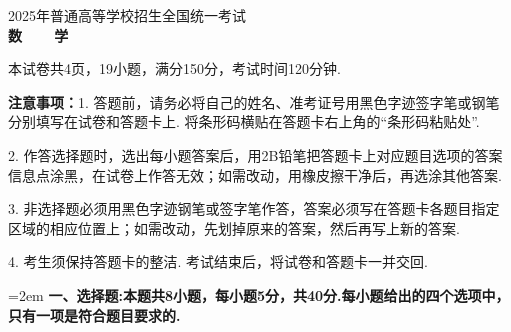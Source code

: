 \documentclass[12pt,a4paper]{article}
\begin{document}
	
	
	\vspace*{0.5cm}
	
	\begin{center}
		{\Large 2025年普通高等学校招生全国统一考试}\\[0.8cm]
		{\LARGE\bfseries 数~~~~学}
	\end{center}
	
	\noindent 本试卷共4页，19小题，满分150分，考试时间120分钟.
	
	\noindent\hangindent=73pt {\bfseries 注意事项：}1. 答题前，请务必将自己的姓名、准考证号用黑色字迹签字笔或钢笔分别填写在试卷和答题卡上.  将条形码横贴在答题卡右上角的“条形码粘贴处”. 
	
	\noindent\hangindent=73pt\hspace{61pt}2. 作答选择题时，选出每小题答案后，用2B铅笔把答题卡上对应题目选项的答案信息点涂黑，在试卷上作答无效；如需改动，用橡皮擦干净后，再选涂其他答案. 
	
	\noindent\hangindent=73pt\hspace{61pt}3. 非选择题必须用黑色字迹钢笔或签字笔作答，答案必须写在答题卡各题目指定区域的相应位置上；如需改动，先划掉原来的答案，然后再写上新的答案. 
	
	\noindent\hangindent=73pt\hspace{61pt}4. 考生须保持答题卡的整洁. 考试结束后，将试卷和答题卡一并交回. 

	
	\noindent\hangindent=2em {\bfseries 一、选择题:本题共8小题，每小题5分，共40分.每小题给出的四个选项中，只有一项是符合题目要求的.}
	
\end{document}
